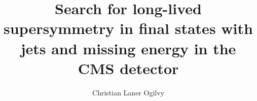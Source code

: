\documentclass[hyperpdf,oneside,nobind]{hepthesis}
\title{Search for long-lived supersymmetry in 
final states with jets and missing energy in the CMS detector}
\author{Christian Laner Ogilvy}
\begin{document}
	

\begin{frontmatter}
  
\end{frontmatter}

\begin{mainmatter}
  
  
  
  
  
  
\end{mainmatter}

\begin{appendices}
  
\end{appendices}

\begin{backmatter}
  
\end{backmatter}

\end{document}
